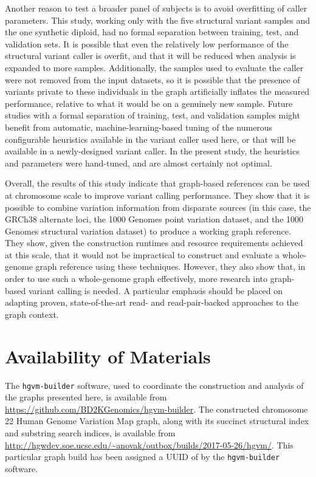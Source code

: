 Another reason to test a broader panel of subjects is to avoid overfitting of caller parameters. This study, working only with the five structural variant samples and the one synthetic diploid, had no formal separation between training, test, and validation sets. It is possible that even the relatively low performance of the structural variant caller is overfit, and that it will be reduced when analysis is expanded to more samples. Additionally, the samples used to evaluate the caller were not removed from the input datasets, so it is possible that the presence of variants private to these individuals in the graph artificially inflates the measured performance, relative to what it would be on a genuinely new sample. Future studies with a formal separation of training, test, and validation samples might benefit from automatic, machine-learning-based tuning of the numerous configurable heuristics available in the variant caller used here, or that will be available in a newly-designed variant caller. In the present study, the heuristics and parameters were hand-tuned, and are almost certainly not optimal.

Overall, the results of this study indicate that graph-based references can be used at chromosome scale to improve variant calling performance. They show that it is possible to combine variation information from disparate sources (in this case, the GRCh38 alternate loci, the 1000 Genomes point variation dataset, and the 1000 Genomes structural variation dataset) to produce a working graph reference. They show, given the construction runtimes and resource requirements achieved at this scale, that it would not be impractical to construct and evaluate a whole-genome graph reference using these techniques. However, they also show that, in order to use such a whole-genome graph effectively, more research into graph-based variant calling is needed. A particular emphasis should be placed on adapting proven, state-of-the-art read- and read-pair-backed approaches to the graph context.


\section{Availability of Materials}

\begin{sloppypar}
The \texttt{hgvm-builder} software, used to coordinate the construction and analysis of the graphs presented here, is available from \url{https://github.com/BD2KGenomics/hgvm-builder}. The constructed chromosome 22 Human Genome Variation Map graph, along with its succinct structural index and substring search indices, is available from \url{http://hgwdev.soe.ucsc.edu/~anovak/outbox/builds/2017-05-26/hgvm/}. This particular graph build has been assigned a UUID of  by the \texttt{hgvm-builder} software.
\end{sloppypar}

